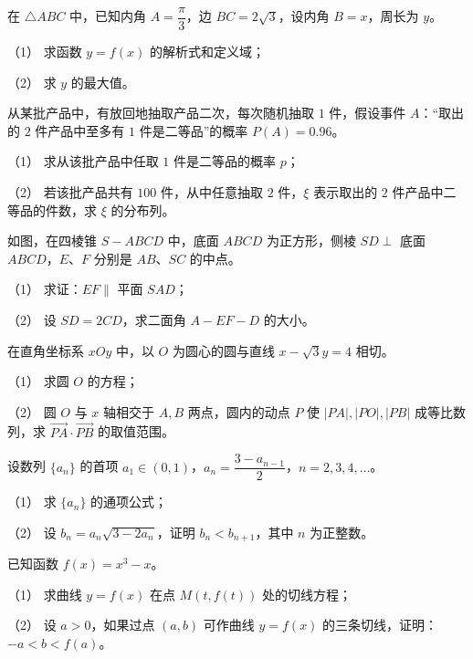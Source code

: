 \begin{question}
在 $\triangle ABC$ 中，已知内角 $A=\dfrac\pi3$，边 $BC=2\sqrt3$，设内角 $B=x$，周长为 $y$。

（1） 求函数 $y=f(x)$ 的解析式和定义域；

（2） 求 $y$ 的最大值。

\end{question}
\begin{question}
从某批产品中，有放回地抽取产品二次，每次随机抽取 $1$ 件，假设事件 $A$：“取出的 $2$ 件产品中至多有 $1$ 件是二等品”的概率 $P(A)=0.96$。

（1） 求从该批产品中任取 $1$ 件是二等品的概率 $p$；

（2） 若该批产品共有 $100$ 件，从中任意抽取 $2$ 件，$\xi$ 表示取出的 $2$ 件产品中二等品的件数，求 $\xi$ 的分布列。

\Needspace{0.4\textheight}
\end{question}
\begin{question}
如图，在四棱锥 $S-ABCD$ 中，底面 $ABCD$ 为正方形，侧棱 $SD\perp$ 底面 $ABCD$，$E\text{、}F$ 分别是 $AB\text{、}SC$ 的中点。
\nopagebreak[4]
\begin{center}\end{center}
\nopagebreak[4]
（1） 求证：$EF\parallel$ 平面 $SAD$；

（2） 设 $SD=2CD$，求二面角 $A-EF-D$ 的大小。

\end{question}
\begin{question}
在直角坐标系 $xOy$ 中，以 $O$ 为圆心的圆与直线 $x-\sqrt3y=4$ 相切。

（1） 求圆 $O$ 的方程；

（2） 圆 $O$ 与 $x$ 轴相交于 $A,B$ 两点，圆内的动点 $P$ 使 $|PA|,|PO|,|PB|$ 成等比数列，求 $\overrightarrow{PA}\cdot\overrightarrow{PB}$ 的取值范围。

\end{question}
\begin{question}
设数列 $\{a_n\}$ 的首项 $a_1\in(0,1)$，$a_n=\dfrac{3-a_{n-1}}2$，$n=2,3,4,\ldots$。

（1） 求 $\{a_n\}$ 的通项公式；

（2） 设 $b_n=a_n\sqrt{3-2a_n}$，证明 $b_n<b_{n+1}$，其中 $n$ 为正整数。

\end{question}
\begin{question}
已知函数 $f(x)=x^3-x$。

（1） 求曲线 $y=f(x)$ 在点 $M(t,f(t))$ 处的切线方程；

（2） 设 $a>0$，如果过点 $(a,b)$ 可作曲线 $y=f(x)$ 的三条切线，证明：$-a<b<f(a)$。

\end{question}